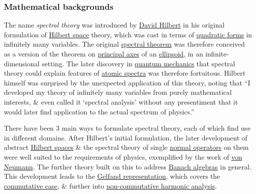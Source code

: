 \documentclass{article}
\begin{document}
\subsubsection{Mathematical backgrounds}
The name {\it spectral theory} was introduced by \href{https://en.wikipedia.org/wiki/David_Hilbert}{\sc David Hilbert} in his original formulation of \href{https://en.wikipedia.org/wiki/Hilbert_space}{Hilbert space} theory, which was cast in terms of \href{https://en.wikipedia.org/wiki/Quadratic_form}{quadratic forms} in infinitely many variables. The original \href{https://en.wikipedia.org/wiki/Spectral_theorem}{spectral theorem} was therefore conceived as a version of the theorem on \href{https://en.wikipedia.org/wiki/Principal_axis_theorem}{principal axes} of an \href{https://en.wikipedia.org/wiki/Ellipsoid}{ellipsoid}, in an infinite-dimensional setting. The later discovery in \href{https://en.wikipedia.org/wiki/Quantum_mechanics}{quantum mechanics} that spectral theory could explain features of \href{https://en.wikipedia.org/wiki/Emission_spectrum}{atomic spectra} was therefore fortuitous. {\sc Hilbert} himself was surprised by the unexpected application of this theory, noting that ``I developed my theory of infinitely many variables from purely mathematical interests, \& even called it `spectral analysis' without any presentiment that it would later find application to the actual spectrum of physics.''

There have been 3 main ways to formulate spectral theory, each of which find use in different domains. After {\sc Hilbert}'s initial formulation, the later development of abstract \href{https://en.wikipedia.org/wiki/Hilbert_space}{Hilbert spaces} \& the spectral theory of single \href{https://en.wikipedia.org/wiki/Normal_operator}{normal operators} on them were well suited to the requirements of physics, exemplified by the work of \href{https://en.wikipedia.org/wiki/John_von_Neumann}{\sc von Neumann}. The further theory built on this to address \href{https://en.wikipedia.org/wiki/Banach_algebra}{Banach algebras} in general. This development leads to the \href{https://en.wikipedia.org/wiki/Gelfand_representation}{Gelfand representation}, which covers the \href{https://en.wikipedia.org/wiki/Commutative_Banach_algebra}{commutative case}, \& further into \href{https://en.wikipedia.org/wiki/Non-commutative_harmonic_analysis}{non-commutative harmonic analysis}.
\end{document}
